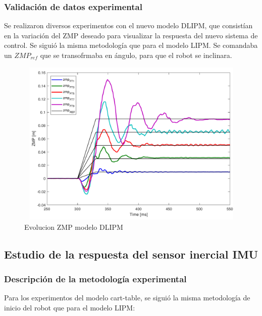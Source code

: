 \subsubsection{Validación de datos experimental}

Se realizaron diversos experimentos con el nuevo modelo DLIPM, que consistían en la variación del ZMP deseado para visualizar la respuesta del nuevo sistema de control. Se siguió la misma metodología que para el modelo LIPM. Se comandaba un $ZMP_{ref}$ que se transofrmaba en ángulo, para que el robot se inclinara. 



\begin{figure}[H]
\centering
\includegraphics[width=13cm, height=8cm]{imagenes/apartado_5/figura4.pdf}
\caption{Evolucion ZMP modelo DLIPM}
\label{figura55}
\end{figure}

\subsection{Estudio de la respuesta del sensor inercial IMU}\label{respuestaIMU}

\subsubsection{Descripción de la metodología experimental}

Para los experimentos del modelo cart-table, se siguió la misma metodología de inicio del robot que para el modelo LIPM:

